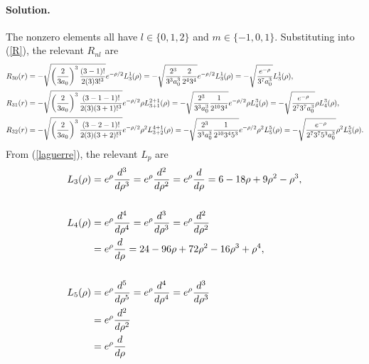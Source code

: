 \documentclass[11pt]{article}
\newcommand{\refeq}[1]{(\ref{#1})}
\newenvironment{solution}
{
    \paragraph{Solution.}
    \ignorespaces
}
{
}
\begin{document}
\begin{solution}
	The nonzero elements all have $l \in \{0, 1, 2\}$ and $m \in \{-1, 0, 1\}$.  Substituting into \refeq{R}, the relevant $R_{n l}$ are
	\begin{align*}
		R_{3 0}(r) &= -\sqrt{\left( \frac{2}{3 a_0} \right)^3 \frac{(3 - 1)!}{2 (3) 3!^3}} e^{-\rho / 2} L_3^1(\rho)
		= -\sqrt{\frac{2^3}{3^3 a_0^3} \frac{2}{2^4 3^4}} e^{-\rho / 2} L_3^1(\rho)
		= -\sqrt{\frac{e^{-\rho}}{3^7 a_0^3}} L_3^1(\rho), \\
		R_{3 1}(r) &= -\sqrt{\left( \frac{2}{3 a_0} \right)^3 \frac{(3 - 1 - 1)!}{2 (3) (3 + 1)!^3}} e^{-\rho / 2} \rho L_{3 + 1}^{2 + 1}(\rho)
		= -\sqrt{\frac{2^3}{3^3 a_0^3} \frac{1}{2^{10} 3^4}} e^{-\rho / 2} \rho L_4^3(\rho)
		= -\sqrt{\frac{e^{-\rho}}{2^7 3^7 a_0^3}} \rho L_4^3(\rho), \\
		R_{3 2}(r) &= -\sqrt{\left( \frac{2}{3 a_0} \right)^3 \frac{(3 - 2 - 1)!}{2 (3) (3 + 2)!^3}} e^{-\rho / 2} \rho^2 L_{3 + 2}^{4 + 1}(\rho)
		= -\sqrt{\frac{2^3}{3^3 a_0^3} \frac{1}{2^{10} 3^4 5^3}} e^{-\rho / 2} \rho^2 L_5^5(\rho)
		= -\sqrt{\frac{e^{-\rho}}{2^7 3^7 5^3 a_0^3}} \rho^2 L_5^5(\rho).
	\end{align*}
	From \refeq{laguerre}, the relevant $L_p$ are
	\begin{align*}
		L_3(\rho) &= e^\rho \dv[3]{}{\rho} (\rho^3 e^{-\rho})
		= e^\rho \dv[2]{}{\rho} (3 \rho^2 e^{-\rho} - \rho^3 e^{-\rho})
		= e^\rho \dv{}{\rho} (6 \rho e^{-\rho} - 6 \rho^2 e^{-\rho} + \rho^3 e^{-\rho})
		= 6 - 18 \rho + 9 \rho^2 - \rho^3, \\ \\
		L_4(\rho) &= e^\rho \dv[4]{}{\rho} (\rho^4 e^{-\rho})
		= e^\rho \dv[3]{}{\rho} (4 \rho^3 e^{-\rho} - \rho^4 e^{-\rho})
		= e^\rho \dv[2]{}{\rho} (12 \rho^2 e^{-\rho} - 8 \rho^3 e^{-\rho} + \rho^4 e^{-\rho}) \\
		&= e^\rho \dv{}{\rho} (24 \rho e^{-\rho} - 36 \rho^2 e^{-\rho} + 12 \rho^3 e^{-\rho} - \rho^4 e^{-\rho})
		= 24 - 96 \rho + 72 \rho^2 - 16 \rho^3 + \rho^4, \\ \\
		L_5(\rho) &= e^\rho \dv[5]{}{\rho} (\rho^5 e^{-\rho})
		= e^\rho \dv[4]{}{\rho} (5 \rho^4 e^{-\rho} - \rho^5 e^{-\rho})
		= e^\rho \dv[3]{}{\rho} (20 \rho^3 e^{-\rho} - 10 \rho^4 e^{-\rho} + \rho^5 e^{-\rho}) \\
		&= e^\rho \dv[2]{}{\rho} (60 \rho^2 e^{-\rho} - 60 \rho^3 e^{-\rho} + 15 \rho^4 e^{-\rho} - \rho^5 e^{-\rho}) \\
		&= e^\rho \dv{}{\rho} (120 \rho e^{-\rho} - 240 \rho^2 e^{-\rho} + 120 \rho^3 e^{-\rho} - 20 \rho^4 e^{-\rho} + \rho^5 e^{-\rho})

\end{align*}
\end{solution}
\end{document}
